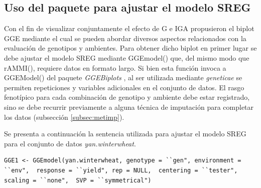 \subsection{Uso del paquete para ajustar el modelo SREG}
\label{subsec:SREGpaquete}
Con el fin de visualizar conjuntamente el efecto de G e IGA \citet{Yanetal2000} propusieron el biplot GGE mediante el cual se pueden abordar diversos aspectos relacionados con la evaluación de genotipos y ambientes. Para obtener dicho biplot en primer lugar se debe ajustar el modelo SREG mediante \textcolor{fandango}{GGEmodel()} que, del mismo modo que \textcolor{fandango}{rAMMI()}, requiere datos en formato largo. Si bien esta función invoca a \textcolor{fandango}{GGEModel()} del paquete \emph{GGEBiplots} \citep{Dumble2017}, al ser utilizada mediante \emph{geneticae} se permiten repeticiones y variables adicionales en el conjunto de datos. El rasgo fenotípico para cada combinación de genotipo y ambiente debe estar registrado, sino se debe recurrir previamente a alguna técnica de imputación para completar los datos (subsección \ref{subsec:metimp}). 

Se presenta a continuación la sentencia utilizada para ajustar el modelo SREG para el conjunto de datos \emph{yan.winterwheat}.

\begin{center}
\begin{tcolorbox}[colframe=aurometalsaurus,colback=backcolour,colbacklower=white,
   				width=1\linewidth,
    			height=0.08\linewidth,
    			boxsep=-3mm]
\begin{lstlisting}
GGE1 <- GGEmodel(yan.winterwheat, genotype = ``gen", environment = ``env",  response = ``yield", rep = NULL,  centering = ``tester", scaling = ``none",  SVP = ``symmetrical")
\end{lstlisting}
\end{tcolorbox}
\end{center}

